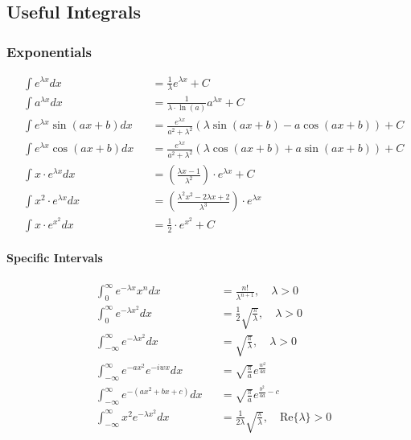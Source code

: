 \subsection{Useful Integrals}
\subsubsection{Exponentials}
\begin{footnotesize}
    \noindent\begin{align*}
         & \int e^{\lambda x}dx           &  & =\frac{1}{\lambda }e^{\lambda x}+C                                                 \\
         & \int a^{\lambda x}dx           &  & =\frac{1}{\lambda \cdot \ln(a)}a^{\lambda x}+C                                     \\
         & \int e^{\lambda x}\sin(ax+b)dx &  & =\frac{e^{\lambda x}}{a^2+\lambda ^2}\left(\lambda \sin(ax+b)-a\cos(ax+b)\right)+C \\
         & \int e^{\lambda x}\cos(ax+b)dx &  & =\frac{e^{\lambda x}}{a^2+\lambda ^2}\left(\lambda \cos(ax+b)+a\sin(ax+b)\right)+C \\
         & \int x \cdot e^{\lambda x}dx   &  & =(\frac{\lambda x-1}{\lambda ^2})\cdot e^{\lambda x}+C                             \\
         & \int x^2 \cdot e^{\lambda x}dx &  & =(\frac{\lambda ^2x^2-2\lambda x+2}{\lambda ^3})\cdot e^{\lambda x}                \\
         & \int x\cdot e^{x^2}dx          &  & =\frac{1}{2}\cdot e^{x^2}+C
    \end{align*}
\end{footnotesize}

\paragraph{Specific Intervals}
\begin{footnotesize}
    \noindent\begin{align*}
         & \int_0^{\infty} e^{-\lambda x}x^n dx         &  & =\frac{n!}{\lambda ^{n+1}},\quad \lambda >0                                       \\
         & \int_0^{\infty} e^{-\lambda x^2} dx          &  & =\frac{1}{2}\sqrt{\frac{\pi}{\lambda }},\quad \lambda >0                          \\
         & \int_{-\infty}^{\infty} e^{-\lambda x^2} dx  &  & =\sqrt{\frac{\pi}{\lambda }},\quad \lambda >0                                     \\
         & \int_{-\infty}^{\infty}e^{-ax^2}e^{-iwx} dx  &  & = \sqrt{\frac{\pi}{a}}e^{\frac{w^2}{4a}}                                          \\
         & \int_{-\infty}^{\infty}e^{-(ax^2+bx+c)}dx    &  & = \sqrt{\frac{\pi}{a}}e^{\frac{b^2}{4a}-c}                                        \\
         & \int_{-\infty}^{\infty}x^2e^{-\lambda x^2}dx &  & = \frac{1}{2\lambda }\sqrt{\frac{\pi}{\lambda }},\quad \mathrm{Re}\{\lambda \} >0
    \end{align*}
\end{footnotesize}
